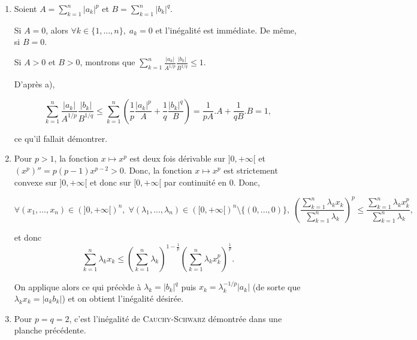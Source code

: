 \documentclass[11pt,a4paper]{article}
\begin{document}
\begin{enumerate}
\begin{enumerate}
$$\forall x\geq0,\;f(x)\geq f(a^{1/(q-1)})=\frac{1}{p}a^{p}+\frac{1}{q}a^{q/(q-1)}-a.a^{1/(q-1)}.$$

Maintenant, $\frac{1}{p}+\frac{1}{q}=1$ fournit $q=\frac{p}{p-1}$ puis $q-1=\frac{1}{p-1}$. Par suite, $\frac{q}{q-1}=p$. Il en résulte que

$$\frac{1}{p}a^{p}+\frac{1}{q}a^{q/(q-1)}-a.a^{1/(q-1)}=(\frac{1}{p}+\frac{1}{q}-1)a^p=0.$$

$f$ est donc positive sur $[0,+\infty[$, ce qui fournit $f(b)\geq0$. De plus, 

$$f(b)=0\Leftrightarrow b=a^{1/(q-1)}\Leftrightarrow b^q=a^{q/(q-1)}\Leftrightarrow b^q=a^p.$$

\item Soient $A=\sum_{k=1}^{n}|a_k|^p$ et $B=\sum_{k=1}^{n}|b_k|^q$.

Si $A=0$, alors $\forall k\in\{1,...,n\},\;a_k=0$ et l'inégalité est immédiate. De même, si $B=0$.

Si $A>0$ et $B>0$, montrons que $\sum_{k=1}^{n}\frac{|a_k|}{A^{1/p}}\frac{|b_k|}{B^{1/q}}\leq1$.

D'après a),

$$\sum_{k=1}^{n}\frac{|a_k|}{A^{1/p}}\frac{|b_k|}{B^{1/q}}\leq
\sum_{k=1}^{n}(\frac{1}{p}\frac{|a_k|^p}{A}+\frac{1}{q}\frac{|b_k|^q}{B})=\frac{1}{pA}.A+\frac{1}{qB}.B=1,$$

ce qu'il fallait démontrer.

\item Pour $p>1$, la fonction $x\mapsto x^p$ est deux fois dérivable sur $]0,+\infty[$ et $(x^p)''=p(p-1)x^{p-2}>0$. Donc, la fonction $x\mapsto x^p$ est strictement convexe sur $]0,+\infty[$ et donc sur $[0,+\infty[$ par continuité en $0$. Donc,

$$\forall(x_1,...,x_n)\in(]0,+\infty[)^n,\;\forall(\lambda_1,...,\lambda_n)\in([0,+\infty[)^n\setminus\{(0,...,0)\},
\;\left(\frac{\sum_{k=1}^{n}\lambda_kx_k}{\sum_{k=1}^{n}\lambda_k}\right)^p\leq
\frac{\sum_{k=1}^{n}\lambda_kx_k^p}{\sum_{k=1}^{n}\lambda_k},$$

et donc 
$$\sum_{k=1}^{n}\lambda_kx_k\leq(\sum_{k=1}^{n}\lambda_k)^{1-\frac{1}{p}}(\sum_{k=1}^{n}\lambda_kx_k^p)^{\frac{1}{p}}.$$

On applique alors ce qui précède à $\lambda_k=|b_k|^q$ puis $x_k=\lambda_k^{-1/p}|a_k|$ (de sorte que $\lambda_kx_k=|a_kb_k|$) et on obtient l'inégalité désirée.

\item Pour $p=q=2$, c'est l'inégalité de \textsc{Cauchy}-\textsc{Schwarz} démontrée dans une planche précédente.
\end{enumerate}
\end{enumerate}
\end{document}
